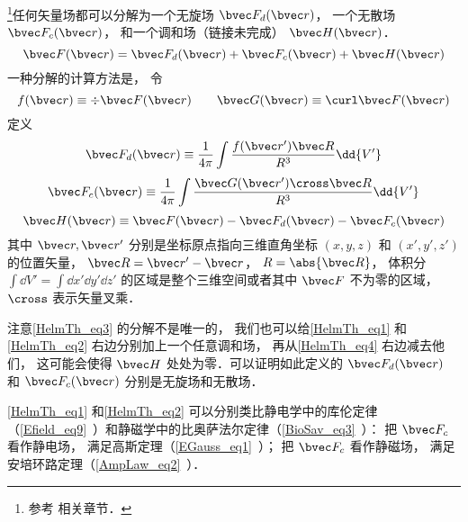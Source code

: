 
\begin{issues}
\issueTODO
\end{issues}


\footnote{参考 \cite{GriffE} 相关章节．}任何矢量场都可以分解为一个无旋场 $\bvec F_{d}(\bvec r)$， 一个无散场 $\bvec F_{c}(\bvec r)$， 和一个调和场（链接未完成） $\bvec H(\bvec r)$．
\begin{equation}\label{HelmTh_eq3}
\bvec F(\bvec r) = \bvec F_{d}(\bvec r) + \bvec F_{c}(\bvec r) + \bvec H(\bvec r)
\end{equation}
一种分解的计算方法是， 令
\begin{equation}
f(\bvec r) \equiv \div \bvec F(\bvec r) \qquad
\bvec G(\bvec r) \equiv \curl \bvec F(\bvec r)
\end{equation}
定义
\begin{equation}\label{HelmTh_eq1}
\bvec F_{d}(\bvec r) \equiv \frac{1}{4\pi}\int \frac{f(\bvec r') \bvec R}{R^3} \dd{V'}
\end{equation}
\begin{equation}\label{HelmTh_eq2}
\bvec F_{c}(\bvec r) \equiv \frac{1}{4\pi}\int \frac{\bvec G(\bvec r')\cross \bvec R}{R^3} \dd{V'}
\end{equation}
\begin{equation}\label{HelmTh_eq4}
\bvec H(\bvec r) \equiv \bvec F(\bvec r) - \bvec F_{d}(\bvec r) - \bvec F_{c}(\bvec r)
\end{equation}
其中 $\bvec r, \bvec r'$ 分别是坐标原点指向三维直角坐标 $(x, y, z)$ 和 $(x', y', z')$ 的位置矢量， $\bvec R = \bvec r' - \bvec r$， $R = \abs{\bvec R}$， 体积分 $\int\dd{V'} = \int\dd{x'}\dd{y'}\dd{z'}$ 的区域是整个三维空间或者其中 $\bvec F$ 不为零的区域， $\cross$ 表示矢量叉乘．

注意\autoref{HelmTh_eq3} 的分解不是唯一的， 我们也可以给\autoref{HelmTh_eq1} 和\autoref{HelmTh_eq2} 右边分别加上一个任意调和场， 再从\autoref{HelmTh_eq4} 右边减去他们， 这可能会使得 $\bvec H$ 处处为零．可以证明如此定义的 $\bvec F_{d}(\bvec r)$ 和 $\bvec F_{c}(\bvec r)$ 分别是无旋场和无散场．

\autoref{HelmTh_eq1} 和\autoref{HelmTh_eq2} 可以分别类比静电学中的库伦定律（\autoref{Efield_eq9}~）和静磁学中的比奥萨法尔定律（\autoref{BioSav_eq3}~）： 把 $\bvec F_c$ 看作静电场， 满足高斯定理（\autoref{EGauss_eq1}~）； 把 $\bvec F_c$ 看作静磁场， 满足安培环路定理（\autoref{AmpLaw_eq2}~）．

